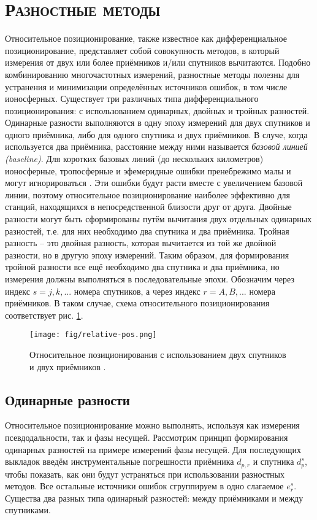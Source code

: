 \section{\textsc{Разностные методы}}

Относительное позиционирование, также известное как дифференциальное позиционирование, представляет собой совокупность методов, в который измерения от двух или более приёмников и/или спутников вычитаются. 
Подобно комбинированию многочастотных измерений, разностные методы полезны для устранения и минимизации определённых источников ошибок, в том числе ионосферных.
Существует три различных типа дифференциального позиционирования: с использованием одинарных, двойных и тройных разностей. 
Одинарные разности выполняются в одну эпоху измерений для двух спутников и одного приёмника, либо для одного спутника и двух приёмников.
В случе, когда используется два приёмника, расстояние между ними называется \textit{базовой линией (baseline)}.
Для коротких базовых линий (до нескольких километров) ионосферные, тропосферные и эфемеридные ошибки пренебрежимо малы и могут игнорироваться \cite{Seeber2003}. 
Эти ошибки будут расти вместе с увеличением базовой линии, поэтому относительное позиционирование наиболее эффективно для станций, находящихся в непосредственной близости друг от друга.
Двойные разности могут быть сформированы путём вычитания двух отдельных одинарных разностей, т.е. для них необходимо два спутника и два приёмника. 
Тройная разность -- это двойная разность, которая вычитается из той же двойной разности, но в другую эпоху измерений.
Таким образом, для формирования тройной разности все ещё необходимо два спутника и два приёмника, но измерения должны выполняться в последовательные эпохи.
Обозначим через индекс $s=j,k,...$ номера спутников, а через индекс $r=A,B,...$ номера приёмников. 
В таком случае, схема относительного позиционирования соответствует рис. \ref{fig-relative-pos}.
\begin{figure}[h]
\centering    
\texttt{[image: fig/relative-pos.png]}    
\caption{Относительное позиционирования с использованием двух спутников и двух приёмников \cite{Seeber2003}.}
\label{fig-relative-pos}      
\end{figure}  

\subsection*{\textbf{Одинарные разности}}

Относительное позиционирование можно выполнять, используя как измерения псевдодальности, так и фазы несущей.
Рассмотрим принцип формирования одинарных разностей на примере измерений фазы несущей.
Для последующих выкладок введём инструментальные погрешности приёмника $d_{p,r}$ и спутника $d_p^s$, чтобы показать, как они будут устраняться при использовании разностных методов.
Все остальные источники ошибок сгруппируем в одно слагаемое $e_r^s$.
Существа два разных типа одинарный разностей: между приёмниками и между спутниками.

